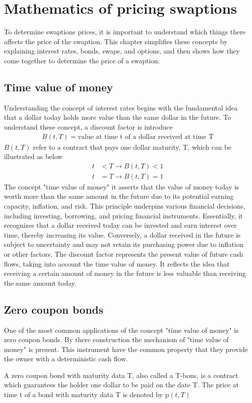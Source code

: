 \section{Mathematics of pricing swaptions}
To determine swaptions prices, it is important to understand which things there affects the price of the swaption. 
This chapter simplifies these concepts by explaining interest rates, bonds, swaps, and options, 
and then shows how they come together to determine the price of a swaption.
\subsection{Time value of money}
Understanding the concept of interest rates begins with the fundamental idea that a dollar today holds 
more value than the same dollar in the future. To understand these concept, a discount factor is introduce 
\begin{align*}
    B(t,T) = \text{value at time t of a dollar received at time T}
\end{align*} 
$B(t,T)$ refer to a contract that pays one dollar maturity, T, which can be illustrated as below
\begin{align*}
    t & < T \rightarrow B(t,T) < 1 \\
    t & = T \rightarrow B(t,T) = 1
\end{align*}
The concept "time value of money" it asserts that the value of money today is worth more than
the same amount in the future due to its potential earning capacity, inflation, and risk.
This principle underpins various financial decisions, including investing, borrowing,
and pricing financial instruments. Essentially, it recognizes that a dollar received today can be invested 
and earn interest over time, thereby increasing its value. Conversely, a dollar received in the future
is subject to uncertainty and may not retain its purchasing power due to inflation or other factors.
The discount factor represents the present value of future cash flows, taking into account the time value of money.
It reflects the idea that receiving a certain amount of money in the future is less valuable than receiving 
the same amount today.
\subsection{Zero coupon bonds}
One of the most common applications of the concept "time value of money" is zero coupon bonds. 
By there construction the mechanism of "time value of money" is present. This instrument 
have the common property that they provide the owner with a deterministic cash flow. 
\begin{definition}\label{def:zcb}
    A zero coupon bond with maturity data T, also called a T-bons, is a contract which 
    guarantees the holder one dollar to be paid on the date T. The price at time t of 
    a bond with maturity data T is denoted by p$(t,T)$ \cite{Bjork} 
\end{definition} 
